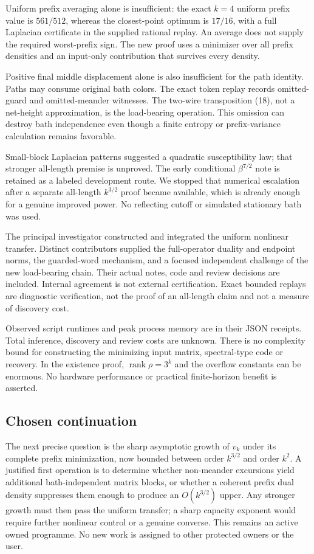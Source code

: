 \documentclass[11pt]{article}
\newcommand{\rank}{\operatorname{rank}}
\begin{document}
Uniform prefix averaging alone is insufficient: the exact $k=4$ uniform
prefix value is $561/512$, whereas the closest-point optimum is $17/16$,
with a full Laplacian certificate in the supplied rational replay.
An average does not supply the required worst-prefix sign. The new proof
uses a minimizer over all prefix densities and an input-only contribution
that survives every density.

Positive final middle displacement alone is also insufficient for the
path identity. Paths may consume original bath colors. The exact token
replay records omitted-guard and omitted-meander witnesses. The two-wire
transposition (18), not a net-height approximation, is the load-bearing
operation. This omission can destroy bath independence even though a
finite entropy or prefix-variance calculation remains favorable.

Small-block Laplacian patterns suggested a quadratic susceptibility law;
that stronger all-length premise is unproved. The early conditional
$\beta^{7/2}$ note is retained as a labeled development route. We stopped
that numerical escalation after a separate all-length $k^{3/2}$ proof
became available, which is already enough for a genuine improved power.
No reflecting cutoff or simulated stationary bath was used.

The principal investigator constructed and integrated the uniform
nonlinear transfer. Distinct contributors supplied the full-operator
duality and endpoint norms, the guarded-word mechanism, and a focused
independent challenge of the new load-bearing chain. Their actual notes,
code and review decisions are included. Internal agreement is not external
certification. Exact bounded replays are diagnostic verification, not the
proof of an all-length claim and not a measure of discovery cost.

Observed script runtimes and peak process memory are in their JSON
receipts. Total inference, discovery and review costs are unknown. There
is no complexity bound for constructing the minimizing input matrix,
spectral-type code or recovery. In the existence proof, $\rank\rho=3^k$
and the overflow constants can be enormous. No hardware performance or
practical finite-horizon benefit is asserted.

\subsection{Chosen continuation}

The next precise question is the sharp asymptotic growth of $v_k$ under
its complete prefix minimization, now bounded between order $k^{3/2}$
and order $k^2$. A justified first operation is to determine whether
non-meander excursions yield additional bath-independent matrix blocks,
or whether a coherent prefix dual density suppresses them enough to
produce an $O(k^{3/2})$ upper. Any stronger growth must then pass the
uniform transfer; a sharp capacity exponent would require further
nonlinear control or a genuine converse. This remains an active owned
programme. No new work is assigned to other protected owners or the user.
\end{document}
